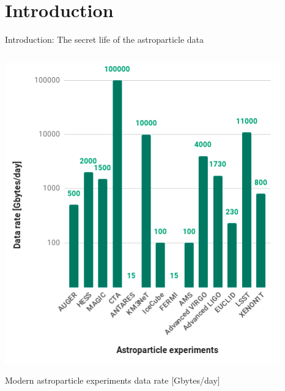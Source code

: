 \section{Introduction}

\begin{frame}
\titlepage
\end{frame}

\begin{frame}{Introduction: The secret life of the astroparticle data}
\small
\begin{columns}
  \begin{column}[t]{0.45\textwidth}
    \begin{center}
      \includegraphics[width=0.79\linewidth]{pics/appec_base4.png}
    \end{center}
    \vspace{-2\parsep}
    \small Modern astroparticle experiments data rate [Gbytes/day]\footnotemark[1] %
  \end{column}
  \hfill
  \begin{column}[t]{0.53\textwidth}

\end{column}
\end{columns}
\end{frame}
